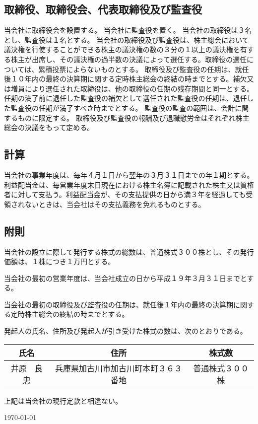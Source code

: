 \documentclass[10pt,a4paper,uplatex]{jsarticle}
\begin{document}
\subsection{取締役、取締役会、代表取締役及び監査役}
当会社に取締役会を設置する。
当会社に監査役を置く。
当会社の取締役は３名とし、監査役は１名とする。
当会社の取締役及び監査役は、株主総会において議決権を行使することができる株主の議決権の数の３分の１以上の議決権を有する株主が出席し、その議決権の過半数の決議によって選任する。取締役の選任については、累積投票によらないものとする。
取締役及び監査役の任期は、就任後１０年内の最終の決算期に関する定時株主総会の終結の時までとする。補欠又は増員により選任された取締役は、他の取締役の任期の残存期間と同一とする。任期の満了前に退任した監査役の補欠として選任された監査役の任期は、退任した監査役の任期が満了すべき時までとする。
監査役の監査の範囲は、会計に関するものに限定する。 
取締役及び監査役の報酬及び退職慰労金はそれぞれ株主総会の決議をもって定める。


\subsection{計算}
当会社の事業年度は、毎年４月１日から翌年の３月３１日までの年１期とする。
利益配当金は、毎営業年度末日現在における株主名簿に記載された株主又は質権者に対して支払う。利益配当金が、その支払提供の日から満３年を経過しても受領されないときは、当会社はその支払義務を免れるものとする。

\subsection{附則}
当会社の設立に際して発行する株式の総数は、普通株式３００株とし、その発行価額は、１株につき１万円とする。

当会社の最初の営業年度は、当会社成立の日から平成１９年３月３１日までとする。

当会社の最初の取締役及び監査役の任期は、就任後１年内の最終の決算期に関する定時株主総会の終結の時までとする。

発起人の氏名、住所及び発起人が引き受けた株式の数は、次のとおりである。
\begin{table}[h]
\begin{tabular}{|c|c|c|}\hline
氏名        &  住所                                  & 株式数             \\ \hline
井原　良忠  & 兵庫県加古川市加古川町本町３６３番地   & 普通株式３００株   \\ \hline
\end{tabular}
\end{table}

\vspace{20pt}
上記は当会社の現行定款と相違ない。
\begin{flushleft} 
\today\\
\vspace{10pt}
\MakeSignatureField
\end{flushleft}
\end{document}
